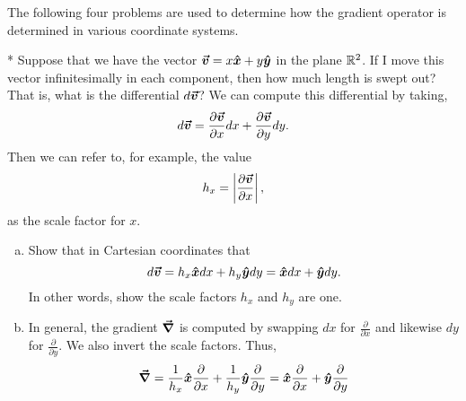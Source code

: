 \documentclass[12pt]{article} %
\begin{document}
\vspace*{1cm}
\begin{center} 
The following four problems are used to determine how the gradient operator is determined in various coordinate systems.
\end{center}

\vspace*{1cm}
\begin{problem} *
    Suppose that we have the vector $\boldsymbol{\boldsymbol{\vec{v}}} = x\boldsymbol{\hat{x}} + y\boldsymbol{\hat{y}}$ in the plane $\mathbb{R}^2$.  If I move this vector infinitesimally in each component, then how much length is swept out? That is, what is the differential $d\boldsymbol{\boldsymbol{\vec{v}}}$? We can compute this differential by taking,
    \[
    d\boldsymbol{\boldsymbol{\vec{v}}} = \frac{\partial \boldsymbol{\boldsymbol{\vec{v}}}}{\partial x}dx+\frac{\partial \boldsymbol{\boldsymbol{\vec{v}}}}{\partial y}dy.
    \]
    Then we can refer to, for example, the value
    \[
    h_x = \left| \frac{\partial \boldsymbol{\boldsymbol{\vec{v}}}}{\partial x} \right|,
    \]
    as the scale factor for $x$.
    \begin{enumerate}[(a)]
        \item Show that in Cartesian coordinates that
        \[
        d\boldsymbol{\boldsymbol{\vec{v}}} = h_x \boldsymbol{\hat{x}} dx + h_y \boldsymbol{\hat{y}} dy = \boldsymbol{\hat{x}} dx + \boldsymbol{\hat{y}} dy.
        \]
        In other words, show the scale factors $h_x$ and $h_y$ are one.
        \item In general, the gradient $\boldsymbol{\vec{\nabla}}$ is computed by swapping $dx$ for $\frac{\partial}{\partial x}$ and likewise $dy$ for $\frac{\partial}{\partial y}$.  We also invert the scale factors. Thus,
        \[
        \boldsymbol{\vec{\nabla}} = \frac{1}{h_x} \boldsymbol{\hat{x}} \frac{\partial }{\partial x} + \frac{1}{h_y} \boldsymbol{\hat{y}} \frac{\partial }{\partial y} = \boldsymbol{\hat{x}} \frac{\partial }{\partial x} + \boldsymbol{\hat{y}} \frac{\partial }{\partial y}
        \]
    \end{enumerate}
\end{problem}
\end{document}
